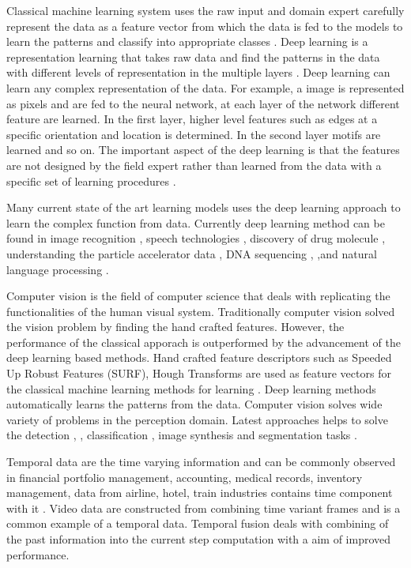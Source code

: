    Classical machine learning system uses the raw input and domain expert carefully represent the data as a feature vector from which the data is fed to the models to learn the patterns and classify into appropriate classes \cite{36_lecun2015deep}. 
    Deep learning is a representation learning that takes raw data and find the patterns in the data with different levels of representation in the multiple layers \cite{36_lecun2015deep}. Deep learning can learn any complex representation of the data. For example, a image is represented as pixels and are fed to the neural network, at each layer of the network different feature are learned. In the first layer, higher level features such as edges at a specific orientation and location is determined. In the second layer motifs are learned and so on. The important aspect of the deep learning is that the features are not designed by the field expert rather than learned from the data with a specific set of learning procedures \cite{36_lecun2015deep}.
    
    Many current state of the art learning models uses the deep learning approach to learn the complex function from data. Currently deep learning method can be found in image recognition \cite{37_farabet2012learning}, speech technologies \cite{38_hinton2012deep}, discovery of drug molecule \cite{39_patel2020machine} , understanding the particle accelerator data \cite{40_ciodaro2012online}, DNA sequencing \cite{41_zhang2021deep}, ,and natural language processing \cite{42_hirschberg2015advances}. 
    
    Computer vision is the field of computer science that deals with replicating the functionalities of the human visual system. Traditionally computer vision solved the vision problem by finding the hand crafted features. However, the performance of the classical apporach is outperformed by the advancement of the deep learning based methods. Hand crafted feature descriptors such as Speeded Up Robust Features (SURF),  Hough Transforms are used as feature vectors for the classical machine learning methods for learning \cite{46_o2019deep}. Deep learning methods automatically learns the patterns from the data. Computer vision solves wide variety of problems in the perception domain. Latest approaches helps to solve the detection \cite{44_mohanty2016using}, \cite{45_han2021ecological}, classification \cite{43_srivastava2021comparative}, image synthesis and segmentation tasks \cite{47_minaee2021image}.
    
    Temporal data are the time varying information and can be commonly observed in financial portfolio management, accounting, medical records, inventory management, data from airline, hotel, train industries contains time component with it \cite{48_jensen1999temporal}. Video data are constructed from combining time variant frames and is a common example of a temporal data. Temporal fusion deals with combining of the past information into the current step computation with a aim of improved performance. 
    
